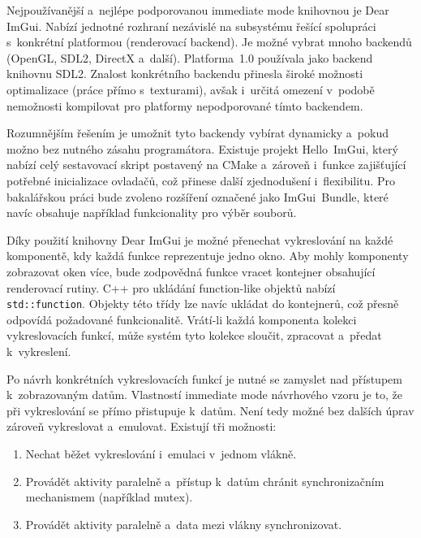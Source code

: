 Nejpoužívanější a~nejlépe podporovanou immediate mode knihovnou je Dear ImGui.  Nabízí jednotné rozhraní nezávislé na subsystému řešící spolupráci s~konkrétní platformou (renderovací backend). Je možné vybrat mnoho backendů (OpenGL, SDL2, DirectX a~další). Platforma~1.0 používala jako backend knihovnu SDL2. Znalost konkrétního backendu přinesla široké možnosti optimalizace (práce přímo s~texturami), avšak i~určitá omezení v~podobě nemožnosti kompilovat pro platformy nepodporované tímto backendem.

Rozumnějším řešením je umožnit tyto backendy vybírat dynamicky a~pokud možno bez nutného zásahu programátora. Existuje projekt Hello~ImGui, který nabízí celý sestavovací skript postavený na CMake a~zároveň i~funkce zajišťující potřebné inicializace ovladačů, což přinese další zjednodušení i~flexibilitu. Pro bakalářskou práci bude zvoleno rozšíření označené jako ImGui~Bundle, které navíc obsahuje například funkcionality pro výběr souborů.

Díky použití knihovny Dear ImGui je možné přenechat vykreslování na každé komponentě, kdy každá funkce reprezentuje jedno okno. Aby mohly komponenty zobrazovat oken více, bude zodpovědná funkce vracet kontejner obsahující renderovací rutiny. C++ pro ukládání function-like objektů nabízí \texttt{std::function}. Objekty této třídy lze navíc ukládat do kontejnerů, což přesně odpovídá požadované funkcionalitě. Vrátí-li každá komponenta kolekci vykreslovacích funkcí, může systém tyto kolekce sloučit, zpracovat a~předat k~vykreslení.

Po návrh konkrétních vykreslovacích funkcí je nutné se zamyslet nad přístupem k~zobrazovaným datům. Vlastností immediate mode návrhového vzoru je to, že při vykreslování se přímo přistupuje k~datům. Není tedy možné bez dalších úprav zároveň vykreslovat a~emulovat. Existují tři možnosti:
\begin{enumerate}
	\item Nechat běžet vykreslování i~emulaci v~jednom vlákně.
	\item Provádět aktivity paralelně a~přístup k~datům chránit synchronizačním mechanismem (například mutex).
	\item Provádět aktivity paralelně a~data mezi vlákny synchronizovat.
\end{enumerate}

